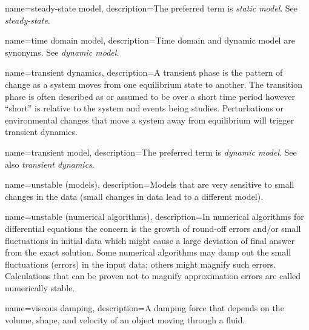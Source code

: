 {
	name=steady-state model,
	description=The preferred term is \textit{static model}.  See \emph{steady-state}.
}


{
	name=time domain model,
	description=Time domain and dynamic model are synonyms.  See \emph{dynamic model.}
}

{
	name=transient dynamics,
    description=A transient phase is the pattern of change as a system moves from one equilibrium state to another.  The transition phase is often described as\comma{} or assumed to be\comma{} over a short time period\comma{} however\comma{} ``short'' is relative to the system and events being studies.  Perturbations or environmental changes that move a system away from equilibrium will trigger transient dynamics.
}

{
	name=transient model,
	description=The preferred term is \textit{dynamic model}.  See also \emph{transient dynamics}.
}


{
    name=unstable (models),
    description=Models that are very sensitive to small changes in the data (small changes in data lead to a different model).
}

{
    name=unstable (numerical algorithms),
    description=In numerical algorithms for differential equations the concern is the growth of round-off errors and/or small fluctuations in initial data which might cause a large deviation of final answer from the exact solution.  Some numerical algorithms may damp out the small fluctuations (errors) in the input data; others might magnify such errors.  Calculations that can be proven not to magnify approximation errors are called numerically stable.
}

{
	name=viscous damping,
	description={A damping force that depends on the volume, shape, and velocity of an object moving through a fluid.}
}

